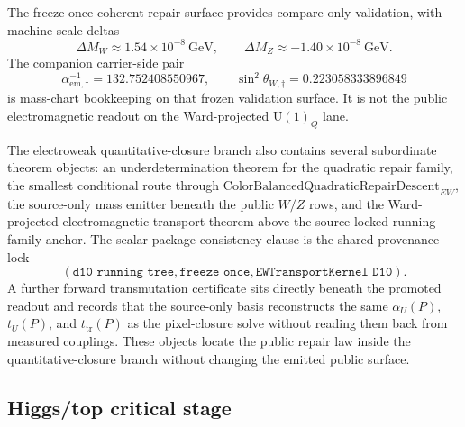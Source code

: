 \documentclass[11pt]{article}
\newcommand{\U}{\mathrm{U}}
\begin{document}
The freeze-once coherent repair surface provides compare-only validation, with machine-scale deltas
\[
\Delta M_W\approx 1.54\times 10^{-8}~\mathrm{GeV},
\qquad
\Delta M_Z\approx -1.40\times 10^{-8}~\mathrm{GeV}.
\]
The companion carrier-side pair
\[
\alpha_{\mathrm{em},\dagger}^{-1}=132.752408550967,
\qquad
\sin^2\theta_{W,\dagger}=0.223058333896849
\]
is mass-chart bookkeeping on that frozen validation surface. It is not the public electromagnetic
readout on the Ward-projected \(\U(1)_Q\) lane.

The electroweak quantitative-closure branch also contains several subordinate theorem objects: an
underdetermination theorem for the quadratic repair family, the smallest conditional route
through \(\mathrm{ColorBalancedQuadraticRepairDescent}_{EW}\), the source-only mass emitter
beneath the public \(W/Z\) rows, and the Ward-projected electromagnetic transport theorem above
the source-locked running-family anchor. The scalar-package consistency clause is the shared
provenance lock
\[
(\texttt{d10\_running\_tree},\texttt{freeze\_once},\texttt{EWTransportKernel\_D10}).
\]
A further forward transmutation certificate sits directly beneath the promoted readout and
records that the source-only basis reconstructs the same \(\alpha_U(P)\), \(t_U(P)\), and
\(t_{\mathrm{tr}}(P)\) as the pixel-closure solve without reading them back from measured
couplings. These objects locate the public repair law inside the quantitative-closure branch without
changing the emitted public surface.

\subsection{Higgs/top critical stage}
\end{document}
